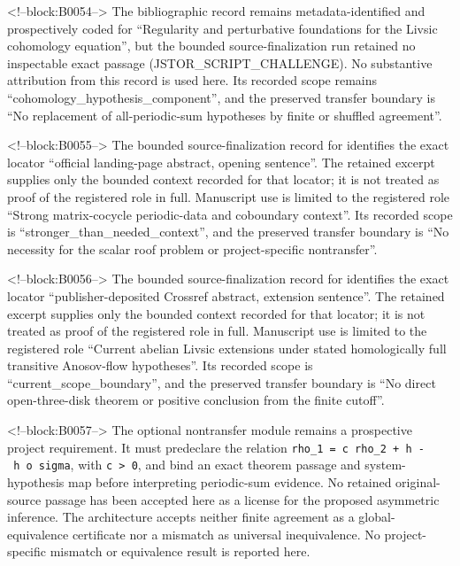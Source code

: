 \documentclass[11pt,a4paper]{article}
\begin{document}
<!--block:B0054-->
The bibliographic record \citep{P30-S24} remains metadata-identified and
prospectively coded for ``Regularity and perturbative foundations for the Livsic cohomology equation'', but the bounded source-finalization
run retained no inspectable exact passage (JSTOR\_SCRIPT\_CHALLENGE).  No substantive
attribution from this record is used here.  Its recorded scope remains
``cohomology\_hypothesis\_component'', and the preserved transfer boundary is ``No replacement of all-periodic-sum hypotheses by finite or shuffled agreement''.

<!--block:B0055-->
The bounded source-finalization record for \citep{P30-S25} identifies
the exact locator ``official landing-page abstract, opening sentence''.  The retained excerpt supplies only the
bounded context recorded for that locator; it is not treated as proof of the
registered role in full.  Manuscript use is limited to the registered role ``Strong matrix-cocycle periodic-data and coboundary context''.
Its recorded scope is ``stronger\_than\_needed\_context'', and the preserved
transfer boundary is ``No necessity for the scalar roof problem or project-specific nontransfer''.

<!--block:B0056-->
The bounded source-finalization record for \citep{P30-S26} identifies
the exact locator ``publisher-deposited Crossref abstract, extension sentence''.  The retained excerpt supplies only the
bounded context recorded for that locator; it is not treated as proof of the
registered role in full.  Manuscript use is limited to the registered role ``Current abelian Livsic extensions under stated homologically full transitive Anosov-flow hypotheses''.
Its recorded scope is ``current\_scope\_boundary'', and the preserved
transfer boundary is ``No direct open-three-disk theorem or positive conclusion from the finite cutoff''.

<!--block:B0057-->
The optional nontransfer module remains a prospective project requirement. It must predeclare the relation \texttt{rho\_1\ =\ c\ rho\_2\ +\ h\ -\ h\ o\ sigma}, with \texttt{c\ \textgreater{}\ 0}, and bind an exact theorem passage and system-hypothesis map before interpreting periodic-sum evidence. No retained original-source passage has been accepted here as a license for the proposed asymmetric inference. The architecture accepts neither finite agreement as a global-equivalence certificate nor a mismatch as universal inequivalence. No project-specific mismatch or equivalence result is reported here.
\end{document}
